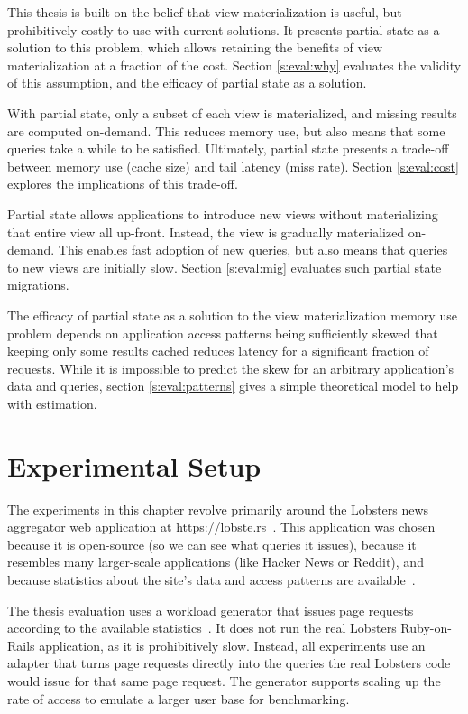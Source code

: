This thesis is built on the belief that view materialization is useful, but
prohibitively costly to use with current solutions. It presents partial state as
a solution to this problem, which allows retaining the benefits of view
materialization at a fraction of the cost. Section \ref{s:eval:why} evaluates
the validity of this assumption, and the efficacy of partial state as a
solution.

With partial state, only a subset of each view is materialized, and missing
results are computed on-demand. This reduces memory use, but also means that
some queries take a while to be satisfied. Ultimately, partial state presents a
trade-off between memory use (cache size) and tail latency (miss rate). Section
\ref{s:eval:cost} explores the implications of this trade-off.

Partial state allows applications to introduce new views without materializing
that entire view all up-front. Instead, the view is gradually materialized
on-demand. This enables fast adoption of new queries, but also means that
queries to new views are initially slow. Section \ref{s:eval:mig} evaluates such
partial state migrations.

The efficacy of partial state as a solution to the view materialization memory
use problem depends on application access patterns being sufficiently skewed that
keeping only some results cached reduces latency for a significant fraction of
requests. While it is impossible to predict the skew for an arbitrary
application's data and queries, section \ref{s:eval:patterns} gives a simple
theoretical model to help with estimation.

\section{Experimental Setup}
\label{s:eval:setup}

The experiments in this chapter revolve primarily around the Lobsters news
aggregator web application at \url{https://lobste.rs}~\cite{lobsters}. This
application was chosen because it is open-source (so we can see what queries it
issues), because it resembles many larger-scale applications (like Hacker News
or Reddit), and because statistics about the site's data and access patterns are
available~\cite{lobsters-data}.

The thesis evaluation uses a workload generator that issues page requests
according to the available statistics~\cite{generator}. It does not run the
real Lobsters Ruby-on-Rails application, as it is prohibitively slow. Instead,
all experiments use an adapter that turns page requests directly into the
queries the real Lobsters code would issue for that same page request. The
generator supports scaling up the rate of access to emulate a larger user base
for benchmarking.

